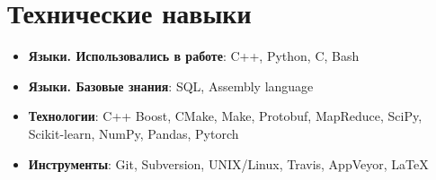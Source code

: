 \documentclass[letterpaper,11pt]{article}
\newcommand{\resumeItem}[2]{
  \item\small{
    \textbf{#1}{: #2 \vspace{-2pt}}
  }
}
\newcommand{\resumeSubItem}[2]{\resumeItem{#1}{#2}\vspace{-4pt}}
\newcommand{\resumeSubHeadingListStart}{\begin{itemize}[leftmargin=*]}
\newcommand{\resumeSubHeadingListEnd}{\end{itemize}}
\begin{document}
\section{Технические навыки}
  \resumeSubHeadingListStart
    \resumeSubItem{Языки. Использовались в работе}{C++, Python, C, Bash}
    \resumeSubItem{Языки. Базовые знания}{SQL, Assembly language}
    \resumeSubItem{Технологии}{C++ Boost, CMake, Make, Protobuf, MapReduce, SciPy, Scikit-learn, NumPy, Pandas, Pytorch}
    \resumeSubItem{Инструменты}{Git, Subversion, UNIX/Linux, Travis, AppVeyor, \LaTeX}
  \resumeSubHeadingListEnd

\end{document}
